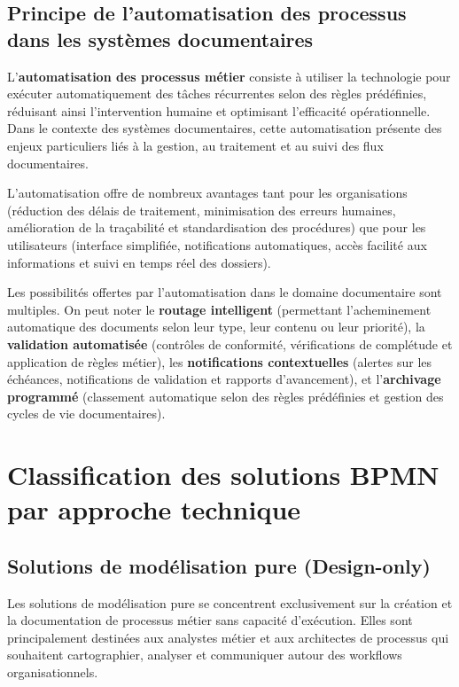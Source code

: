\subsection{Principe de l'automatisation des processus dans les systèmes documentaires}

L'\textbf{automatisation des processus métier} consiste à utiliser la technologie pour exécuter automatiquement des tâches récurrentes selon des règles prédéfinies, réduisant ainsi l'intervention humaine et optimisant l'efficacité opérationnelle. Dans le contexte des systèmes documentaires, cette automatisation présente des enjeux particuliers liés à la gestion, au traitement et au suivi des flux documentaires.

L'automatisation offre de nombreux avantages tant pour les organisations (réduction des délais de traitement, minimisation des erreurs humaines, amélioration de la traçabilité et standardisation des procédures) que pour les utilisateurs (interface simplifiée, notifications automatiques, accès facilité aux informations et suivi en temps réel des dossiers).

Les possibilités offertes par l'automatisation dans le domaine documentaire sont multiples. On peut noter le \textbf{routage intelligent} (permettant l'acheminement automatique des documents selon leur type, leur contenu ou leur priorité), la \textbf{validation automatisée} (contrôles de conformité, vérifications de complétude et application de règles métier), les \textbf{notifications contextuelles} (alertes sur les échéances, notifications de validation et rapports d'avancement), et l'\textbf{archivage programmé} (classement automatique selon des règles prédéfinies et gestion des cycles de vie documentaires).

\section{Classification des solutions BPMN par approche technique}

\subsection{Solutions de modélisation pure (Design-only)}

Les solutions de modélisation pure se concentrent exclusivement sur la création et la documentation de processus métier sans capacité d'exécution. Elles sont principalement destinées aux analystes métier et aux architectes de processus qui souhaitent cartographier, analyser et communiquer autour des workflows organisationnels.

